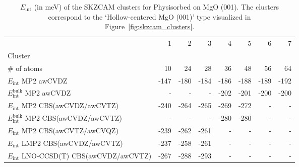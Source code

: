 \begin{table}
\caption{\label{tab:system_eint_mgo_co2_physisorbed}$E_\textrm{int}$ (in meV) of the SKZCAM clusters for Physisorbed  on MgO (001). The clusters correspond to the `Hollow-centered MgO (001)' type visualized in Figure~\ref{fig:skzcam_clusters}.}
\begin{adjustbox}{center,max width=1.4\textwidth}
\begin{tabular}{lrrrrrrr}
\toprule
 & 1 & 2 & 3 & 4 & 5 & 6 & 7 \\ 
Cluster &  &  &  &  &  &  &  \\
\midrule
\# of atoms & 10 & 24 & 28 & 36 & 48 & 56 & 64 \\
$E_\textrm{int}$ MP2 awCVDZ & -147 & -180 & -184 & -186 & -188 & -189 & -192 \\
$E_\textrm{int}^\textrm{bulk}$ MP2 awCVDZ & - & - & - & -202 & -201 & -200 & -200 \\
$E_\textrm{int}$ MP2 CBS(awCVDZ/awCVTZ) & -240 & -264 & -265 & -269 & -272 & - & - \\
$E_\textrm{int}^\textrm{bulk}$ MP2 CBS(awCVDZ/awCVTZ) & - & - & - & -280 & -280 & - & - \\
$E_\textrm{int}$ MP2 CBS(awCVTZ/awCVQZ) & -239 & -262 & -261 & - & - & - & - \\
$E_\textrm{int}$ LMP2 CBS(awCVDZ/awCVTZ) & -237 & -258 & -261 & - & - & - & - \\
$E_\textrm{int}$ LNO-CCSD(T) CBS(awCVDZ/awCVTZ) & -267 & -288 & -293 & - & - & - & - \\
\bottomrule
\end{tabular}
\end{adjustbox}
\end{table}

